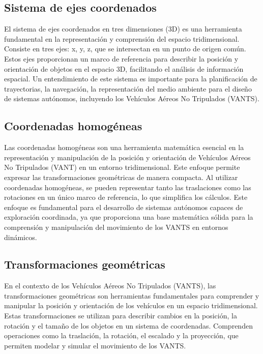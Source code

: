 \subsection*{Sistema de ejes coordenados}

El sistema de ejes coordenados en tres dimensiones (3D) es una herramienta fundamental en la representación y comprensión del espacio tridimensional. Consiste en tres ejes: x, y, z, que se intersectan en un punto de origen común. Estos ejes proporcionan un marco de referencia para describir la posición y orientación de objetos en el espacio 3D, facilitando el análisis de información espacial. Un entendimiento de este sistema es importante para la planificación de trayectorias, la navegación, la representación del medio ambiente para el diseño de sistemas autónomos, incluyendo los Vehículos Aéreos No Tripulados (VANTS).

\subsection*{Coordenadas homogéneas}

Las coordenadas homogéneas son una herramienta matemática esencial en la representación y manipulación de la posición y orientación de Vehículos Aéreos No Tripulados (VANT) en un entorno tridimensional. Este enfoque permite expresar las transformaciones geométricas de manera compacta. Al utilizar coordenadas homogéneas, se pueden representar tanto las traslaciones como las rotaciones en un único marco de referencia, lo que simplifica los cálculos. Este enfoque es fundamental para el desarrollo de sistemas autónomos capaces de exploración coordinada, ya que proporciona una base matemática sólida para la comprensión y manipulación del movimiento de los VANTS en entornos dinámicos.

\subsection*{Transformaciones geométricas}

En el contexto de los Vehículos Aéreos No Tripulados (VANTS), las transformaciones geométricas son herramientas fundamentales para comprender y manipular la posición y orientación de los vehículos en un espacio tridimensional. Estas transformaciones se utilizan para describir cambios en la posición, la rotación y el tamaño de los objetos en un sistema de coordenadas. Comprenden operaciones como la traslación, la rotación, el escalado y la proyección, que permiten modelar y simular el movimiento de los VANTS. 

